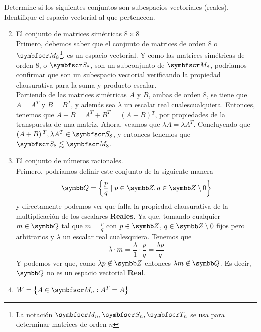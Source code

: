 \item Determine si los siguientes conjuntos son subespacios vectoriales (reales). Identifique el espacio vectorial al que pertenecen.
    \begin{enumerate}[label=\listAlph]
        \setcounter{enumii}{1}
        \item El conjunto de matrices simétricas \(8 \times 8\) \\
            Primero, debemos saber que el conjunto de matrices de orden 8 o \(\fm_8\)\footnote{{La notación \(\fm_n, \fs_n, \ft_n\) se usa para determinar matrices de orden \(n\)}}, es un espacio vectorial. 
            Y como las matrices simétricas de orden 8, o \(\fs_8\), son un subconjunto de \(\fm_8\), podriamos confirmar que son un subespacio vectorial 
            verificando la propiedad clausurativa para la suma y producto escalar.\\
            Partiendo de las matrices simétricas \(A\) y \(B\), ambas de orden 8,
            se tiene que \(A = A^T\) y \(B = B^T\), y además sea \(\lambda\) un escalar real cualescualquiera.
            Entonces, tenemos que \(A + B = A^T + B^T = \left(A + B\right){}^T\), por propiedades de la transpuesta de una matriz.
            Ahora, veamos que \(\lambda A = \lambda A^T\). Concluyendo que \(\left(A + B\right){}^T, \lambda A^T \in \fs_8\), 
            y entonces tenemos que \(\fs_8 \lesssim \fm_8\).
        \setcounter{enumii}{10}
        \item El conjunto de números racionales. \\
            Primero, podriamos definir este conjunto de la siguiente manera
            \[
                \realQ = \left\{ \frac{p}{q} \mid p \in \realZ, q \in \realZ \setminus {0} \right\}
            \]
            y directamente podemos ver que falla la propiedad clausurativa de la multiplicación de los escalares \textbf{Reales}.
            Ya que, tomando cualquier \(m \in \realQ\) tal que \(m = \frac{p}{q}\) con \(p \in \realZ\), 
            \(q \in \realZ \setminus {0}\) fijos pero arbitrarios y \(\lambda\) un escalar real cualesquiera. 
            Tenemos que
            \[
                \lambda \cdot m = \frac{\lambda}{1} \cdot \frac{p}{q} = \frac{\lambda p}{q}
            \]
            Y podemos ver que, como \(\lambda p \not \in \realZ\) entonces \(\lambda m \not\in \realQ\).
            Es decir, \(\realQ\) no es un espacio vectorial \textbf{Real}.
        \setcounter{enumi}{13}
        \item \(W = \left\{ A \in \fm_n: A^T = A \right\}\) \\

\end{enumerate}
